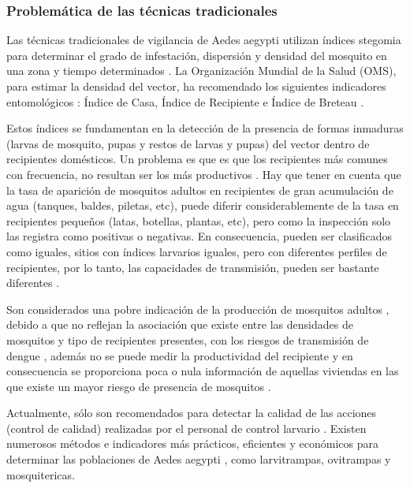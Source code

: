\subsubsection{Problemática de las técnicas tradicionales}
Las técnicas tradicionales de vigilancia de Aedes aegypti utilizan índices stegomia para
determinar el grado de infestación, dispersión y densidad del mosquito en una zona y tiempo
determinados \cite{NINO2011}. La Organización Mundial de la Salud (OMS), para estimar la densidad
del vector, ha recomendado los siguientes indicadores entomológicos : Índice de Casa, Índice de
Recipiente e Índice de Breteau \cite{cenaprece2013}.

Estos índices se fundamentan en la detección de la presencia de formas inmaduras (larvas de
mosquito, pupas y restos de larvas y pupas) del vector dentro de recipientes domésticos. Un
problema es que es que los recipientes más comunes con frecuencia, no resultan ser los más
productivos \cite{world2009dengue}. Hay que tener en cuenta que la tasa de aparición de mosquitos
adultos en recipientes de gran acumulación de agua (tanques, baldes, piletas, etc), puede diferir
considerablemente de la tasa en recipientes pequeños (latas, botellas, plantas, etc), pero como
la inspección solo las registra como positivas o negativas. En consecuencia, pueden ser
clasificados como iguales, sitios con índices larvarios iguales, pero con diferentes perfiles de
recipientes, por lo tanto, las capacidades de transmisión, pueden ser bastante diferentes
\cite{world2009dengue}.

Son considerados una pobre indicación de la producción de mosquitos adultos
\cite{world2009dengue, cenaprece2013}, debido a que no reflejan la asociación que existe entre las
densidades de mosquitos y tipo de recipientes presentes, con los riesgos de transmisión de dengue
\cite{cenaprece2013}, además no se puede medir la productividad del recipiente
\cite{world2009dengue} y en consecuencia se proporciona poca o nula información de aquellas
viviendas en las que existe un mayor riesgo de presencia de mosquitos \cite{cenaprece2013}.

Actualmente, sólo son recomendados para detectar la calidad de las acciones (control de calidad)
realizadas por el personal de control larvario \cite{cenaprece2013}. Existen numerosos métodos e
indicadores más prácticos, eficientes y económicos para determinar las poblaciones de Aedes
aegypti \cite{cenaprece2013}, como larvitrampas, ovitrampas y mosquitericas.
